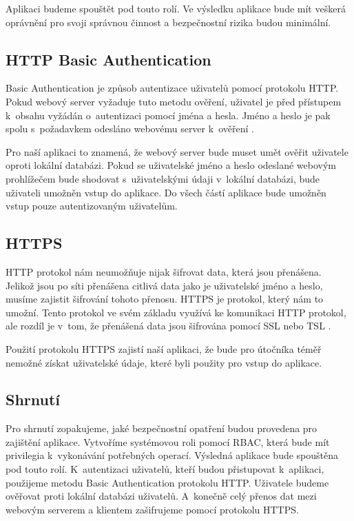     Aplikaci budeme spouštět pod touto rolí. Ve výsledku aplikace bude mít veškerá oprávnění pro svoji správnou činnost a bezpečnostní rizika budou minimální.
    \subsection{HTTP Basic Authentication}
    \label{httpauth}
    Basic Authentication je způsob autentizace uživatelů pomocí protokolu HTTP. Pokud webový server vyžaduje tuto metodu ověření, uživatel je před přístupem k~obsahu vyžádán o~autentizaci pomocí jména a hesla. Jméno a heslo je pak spolu s~požadavkem odesláno webovému server k~ověření \cite{RFC2617}.

    Pro naší aplikaci to znamená, že webový server bude muset umět ověřit uživatele oproti lokální databázi. Pokud se uživatelské jméno a heslo odeslané webovým prohlížečem bude shodovat s~uživatelskými údaji v~lokální databázi, bude uživateli umožněn vstup do aplikace. Do všech částí aplikace bude umožněn vstup pouze autentizovaným uživatelům.

    \subsection{HTTPS}
    \label{https}
    HTTP protokol nám neumožňuje nijak šifrovat data, která jsou přenášena. Jelikož jsou po síti přenášena citlivá data jako je uživatelské jméno a heslo, musíme zajistit šifrování tohoto přenosu. HTTPS je protokol, který nám to umožní. Tento protokol ve svém základu využívá ke komunikaci HTTP protokol, ale rozdíl je v~tom, že přenášená data jsou šifrována pomocí SSL nebo TSL \cite{RFC2818}.

    Použití protokolu HTTPS zajistí naší aplikaci, že bude pro útočníka téměř nemožné získat uživatelské údaje, které byli použity pro vstup do aplikace.
    \subsection{Shrnutí}
    Pro shrnutí zopakujeme, jaké bezpečnostní opatření budou provedena pro zajištění aplikace. Vytvoříme systémovou roli pomocí RBAC, která bude mít privilegia k~vykonávání potřebných operací. Výsledná aplikace bude spouštěna pod touto rolí. K~autentizaci uživatelů, kteří budou přistupovat k~aplikaci, použijeme metodu Basic Authentication protokolu HTTP. Uživatele budeme ověřovat proti lokální databázi uživatelů. A~konečně celý přenos dat mezi webovým serverem a klientem zašifrujeme pomocí protokolu HTTPS.

